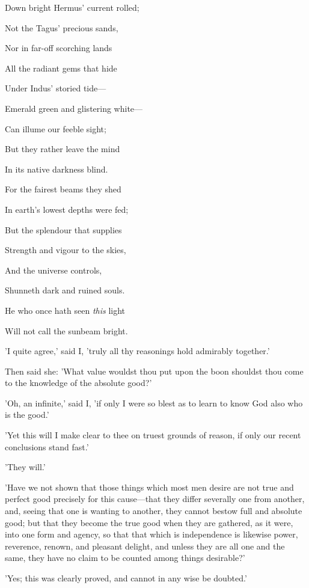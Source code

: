 Down bright Hermus' current rolled;

Not the Tagus' precious sands,

Nor in far-off scorching lands

All the radiant gems that hide

Under Indus' storied tide—

Emerald green and glistering white—

Can illume our feeble sight;

But they rather leave the mind

In its native darkness blind.

For the fairest beams they shed

In earth's lowest depths were fed;

But the splendour that supplies

Strength and vigour to the skies,

And the universe controls,

Shunneth dark and ruined souls.

He who once hath seen \emph{this} light

Will not call the sunbeam bright.


'I quite agree,' said I, 'truly all thy reasonings hold admirably
together.'

Then said she: 'What value wouldst thou put upon the boon shouldst thou
come to the knowledge of the absolute good?'

'Oh, an infinite,' said I, 'if only I were so blest as to learn to know
God also who is the good.'

'Yet this will I make clear to thee on truest grounds of reason, if only
our recent conclusions stand fast.'

'They will.'

'Have we not shown that those things which most men desire are not true
and perfect good precisely for this cause—that they differ severally
one from another, and, seeing that one is wanting to another, they
cannot bestow full and absolute good; but that they become the true good
when they are gathered, as it were, into one form and agency, so that
that which is independence is likewise power, reverence, renown, and
pleasant delight, and unless they are all one and the same, they have no
claim to be counted among things desirable?'

'Yes; this was clearly proved, and cannot in any wise be doubted.'

